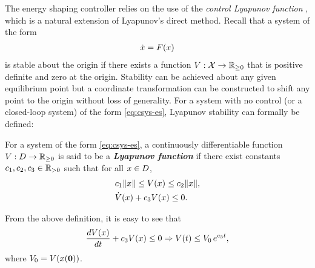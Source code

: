 The energy shaping controller relies on the use of the {\em control Lyapunov
  function} \cite{Artstein1983,Freeman1996}, which is a natural extension of
Lyapunov's direct method.
%
Recall that a system of the form
\begin{align}
  \label{eq:csys-es}
  {\dot {x}} = F(x)
\end{align}
is stable about the origin if there exists a function $V : \mathcal{X} \to \mathbb{R}_{\geq 0}$ that is
positive definite and zero at the origin.
%
Stability can be achieved about any given equilibrium point but a coordinate
transformation can be constructed to shift any point to the origin without loss
of generality.
%
For a system with no control (or a closed-loop system) of the form
\eqref{eq:csys-es}, Lyapunov stability can formally be defined:
%
\begin{definition}
  \label{def:lyap-func}
  For a system of the form \eqref{eq:csys-es}, a continuously differentiable
  function $V : D \to \mathbb{R}_{\geq 0}$ is said to be a {\bf \em Lyapunov function} if
  there exist constants $c_{1}, c_{2}, c_{3} \in \mathbb{R}_{> 0}$ such that for all
  $x \in D$,
  \begin{eqnarray*}
    &c_{1} \|x\| \leq V(x) \leq c_{2} \|x\|,\\
    &{\dot V}(x) + c_{3} V(x) \leq 0.
  \end{eqnarray*}
\end{definition}

From the above definition, it is easy to see that
\begin{align*}
  \frac{dV(x)}{dt} + c_{3} V(x) \leq 0 \Rightarrow V(t) \leq V_{0} \, e^{c_{3} t},
\end{align*}
where $V_{0} = V(x({\mathbf 0}))$.

